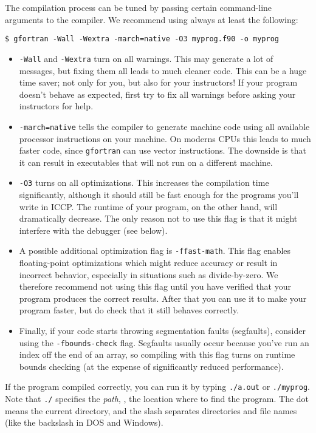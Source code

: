 The compilation process can be tuned by passing certain command-line arguments to the compiler.
We recommend using always at least the following:
\begin{verbatim}
$ gfortran -Wall -Wextra -march=native -O3 myprog.f90 -o myprog
\end{verbatim}
\begin{itemize}
  \item \texttt{-Wall} and \texttt{-Wextra} turn on all warnings.
    This may generate a lot of messages, but fixing them all leads to much cleaner code.
    This can be a huge time saver; not only for you, but also for your instructors!
    If your program doesn't behave as expected, first try to fix all warnings before asking your instructors for help.
  \item \texttt{-march=native} tells the compiler to generate machine code using all available processor instructions on your machine.
    On moderns CPUs this leads to much faster code, since \texttt{gfortran} can use vector instructions.
    The downside is that it can result in executables that will not run on a different machine.
  \item \texttt{-O3} turns on all optimizations.
    This increases the compilation time significantly, although it should still be fast enough for the programs you'll write in ICCP.
    The runtime of your program, on the other hand, will dramatically decrease.
    The only reason not to use this flag is that it might interfere with the debugger (see below).
  \item A possible additional optimization flag is \texttt{-ffast-math}.
    This flag enables floating-point optimizations which might reduce accuracy or result in incorrect behavior, especially in situations such as divide-by-zero.
    We therefore recommend not using this flag until you have verified that your program produces the correct results.
    After that you can use it to make your program faster, but do check that it still behaves correctly.
  \item Finally, if your code starts throwing segmentation faults (segfaults), consider using the \texttt{-fbounds-check} flag.
    Segfaults usually occur because you've run an index off the end of an array, so compiling with this flag turns on runtime bounds checking (at the expense of significantly reduced performance).
\end{itemize}
If the program compiled correctly, you can run it by typing \texttt{./a.out} or \texttt{./myprog}.
Note that \texttt{./} specifies the \emph{path}, \ie, the location where to find the program.
The dot means the current directory, and the slash separates directories and file names (like the backslash in DOS and Windows).


